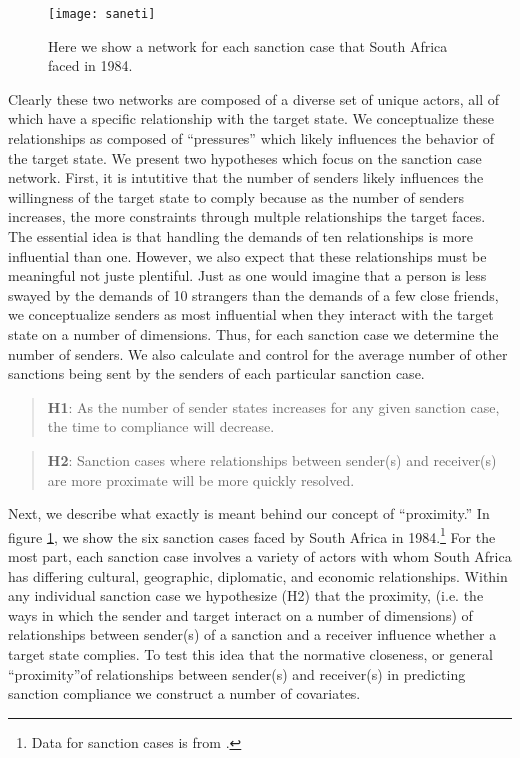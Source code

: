 \begin{figure}[ht]
	\centering
	\texttt{[image: saneti]}
	\caption{Here we show a network for each sanction case that South Africa faced in 1984.}
	\label{fig:saneti}
\end{figure}
\FloatBarrier

Clearly these two networks are composed of a diverse set of unique actors, all of which have a specific relationship with the target state. We conceptualize these relationships as composed of ``pressures'' which likely influences the behavior of the target state. We present two hypotheses which focus on the sanction case network. First, it is intutitive that the number of senders likely influences the willingness of the target state to comply because as the number of senders increases, the more constraints through multple relationships the target faces. The essential idea is that handling the demands of ten relationships is more influential than one. However, we also expect that these relationships must be meaningful not juste plentiful. Just as one would imagine that a person is less swayed by the demands of 10 strangers than the demands of a few close friends, we conceptualize senders as most influential when they interact with the target state on a number of dimensions.  Thus, for each sanction case we determine the number of senders. We also calculate and control for the average number of other sanctions being sent by the senders of each particular sanction case.

\begin{quote}
	\textbf{H1}: As the number of sender states increases for any given sanction case, the time to compliance will decrease. 
\end{quote}

\begin{quote}
	\textbf{H2}: Sanction cases where relationships between sender(s) and receiver(s) are more proximate will be more quickly resolved.
\end{quote}

 Next, we describe what exactly is meant behind our concept of ``proximity.'' In figure \ref{fig:saneti}, we show the six sanction cases faced by South Africa in 1984.\footnote{Data for sanction cases is from \citet{morgan2009threat}.} For the most part, each sanction case involves a variety of actors with whom South Africa has differing cultural, geographic, diplomatic, and economic relationships. Within any individual sanction case we hypothesize (H2) that the proximity, (i.e. the ways in which the sender and target interact on a number of dimensions) of relationships between sender(s) of a sanction and a receiver influence whether a target state complies. To test this idea that the normative closeness, or general ``proximity''of relationships between sender(s) and receiver(s) in predicting sanction compliance we construct a number of covariates. 

